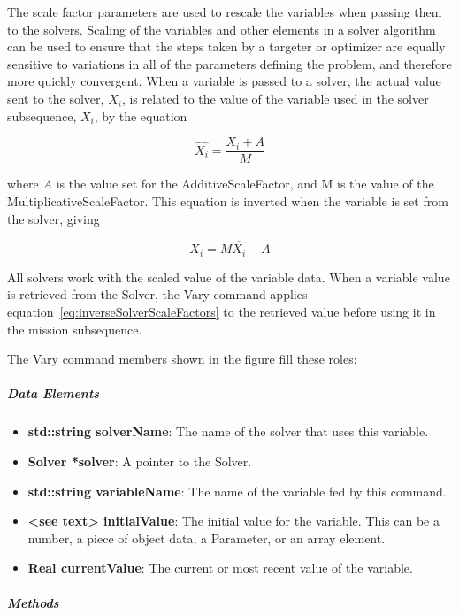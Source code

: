 The scale factor parameters are used to rescale the variables when passing them to the
solvers.  Scaling of the variables and other elements in a solver algorithm can be used to ensure
that the steps taken by a targeter or optimizer are equally sensitive to variations in all of the
parameters defining the problem, and therefore more quickly convergent.  When a variable is passed
to a solver, the actual value sent to the solver, $\hat{X_i}$, is related to the value of the
variable used in the solver subsequence, $X_i$, by the equation

\begin{equation}\label{eq:solverScaleFactors}
   \hat{X_i} = \frac{X_i + A}{M}
\end{equation}

\noindent where $A$ is the value set for the AdditiveScaleFactor, and M is the value of the
MultiplicativeScaleFactor.  This equation is inverted when the variable is set from the solver,
giving

\begin{equation}\label{eq:inverseSolverScaleFactors}
   X_i = M \hat{X_i} - A
\end{equation}

\noindent All solvers work with the scaled value of the variable data. When a variable value is
retrieved from the Solver, the Vary command applies equation~\ref{eq:inverseSolverScaleFactors} to
the retrieved value before using it in the mission subsequence.

The Vary command members shown in the figure fill these roles:

\subparagraph{Data Elements}

\begin{itemize}
\item \textbf{std::string solverName}: The name of the solver that uses this variable.
\item \textbf{Solver *solver}: A pointer to the Solver.
\item \textbf{std::string variableName}: The name of the variable fed by this command.
\item \textbf{<see text> initialValue}: The initial value for the variable.  This can be a number, a
piece of object data, a Parameter, or an array element.
\item \textbf{Real currentValue}: The current or most recent value of the variable.
\end{itemize}

\subparagraph{Methods}

